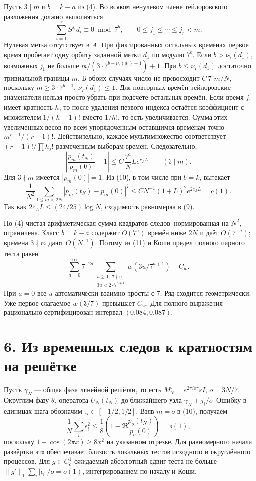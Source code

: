 \documentclass[11pt,a4paper]{article}
\newcommand{\sect}[1]{\section*{\sffamily\color{ink}#1}}
\begin{document}
Пусть $3\mid m$ и $b=k-a$ из (4). Во всяком ненулевом члене тейлоровского разложения должно выполняться
\[
              \sum_{i=1}^r S^{j_i}d_i\equiv0\bmod 7^b,\qquad
                        0\le j_1\le\cdots\le j_r<m .
\]
Нулевая метка отсутствует в $A$. При фиксированных остальных временах первое время пробегает одну орбиту заданной метки $d_1$ по модулю $7^b$. Если $b>\nu_7(d_1)$, возможных $j_1$ не больше $m/(3\cdot7^{b-\nu_7(d_1)-1})+1$. При $b\le\nu_7(d_1)$ достаточно тривиальной границы $m$. В обоих случаях число не превосходит $C\,7^a m/N$, поскольку $m\ge3\cdot7^{b-1}$, $\nu_7(d_1)\le1$. Для повторных времён тейлоровские знаменатели нельзя просто убрать при подсчёте остальных времён. Если время $j_1$ имеет кратность $h$, то после удаления первого индекса остаётся коэффициент с множителем $1/(h-1)!$ вместо $1/h!$, то есть увеличивается. Сумма этих увеличенных весов по всем упорядоченным оставшимся временам точно $m^{r-1}/(r-1)!$. Действительно, каждое мультимножество соответствует $(r-1)!/\prod h_j!$ размеченным выборам времён. Следовательно,
\[
          \left|\frac{p_m(t_N)}{p_m(0)}-1\right|
             \le C\,\frac{7^a}{N} L e^{c_A L}
                      \qquad(3\mid m).                             \tag{10}
\]
Для $3\nmid m$ имеется $|p_m(0)|=1$. Из (10), в том числе при $b=k$, вытекает
\[
 \frac1{N^2}\sum_{1\le m<2N}|p_m(t_N)-p_m(0)|^2
                   \le C N^{-1}(1+L)^2 e^{2c_A L}=o(1).            \tag{11}
\]
Так как $2c_A L\le(24/25)\log N$, сходимость равномерна в (9).

По (4) чистая арифметическая сумма квадратов следов, нормированная на $N^2$, ограничена. Класс $b=k-a$ содержит $O(7^a)$ времён ниже $2N$ и даёт $O(7^{-a})$; времена $3\nmid m$ дают $O(N^{-1})$. Потому из (11) и Коши предел полного парного теста равен
\[
 \boxed{\displaystyle
      \sum_{a=0}^{\infty}7^{-2a}
            \sum_{\substack{u\ge1,\ 7\nmid u\\3u<2\cdot7^{a+1}}}
                  w(3u/7^{a+1})-C_w .}                            \tag{12}
\]
При $a=0$ все $u$ автоматически взаимно просты с 7. Ряд сходится геометрически. Уже первое слагаемое $w(3/7)$ превышает $C_w$. Для полного выражения рационально сертифицирован интервал $(0.084,0.087)$.
\newpage
\sect{6. Из временных следов к кратностям на решётке}
Пусть $\gamma_N$ --- общая фаза линейной решётки, то есть $M_N^o=e^{2\pi i o\gamma_N}I$, $o=3N/7$. Округлим фазу $\theta_i$ оператора $U_N(t_N)$ до ближайшего узла $\gamma_N+j_i/o$. Ошибку в единицах шага обозначим $\epsilon_i\in[-1/2,1/2]$. Взяв $m=o$ в (10), получаем
\[
 \frac1N\sum_i \epsilon_i^2
 \le\frac18\left(1-\Re\frac{p_o(t_N)}{p_o(0)}\right)=o(1),
\]
поскольку $1-\cos(2\pi x)\ge8x^2$ на указанном отрезке. Для равномерного начала развёртки это обеспечивает близость локальных тестов исходного и округлённого процессов. Для $g\in C_c^1$ ожидаемый абсолютный сдвиг теста не больше $\|g'\|_1\sum_i |\epsilon_i|/o=o(1)$, интегрированием по началу и Коши.
\end{document}
